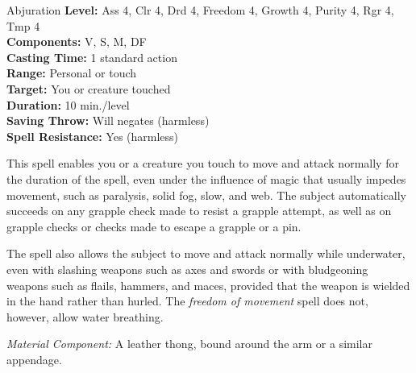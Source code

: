 {Abjuration}
{
	\textbf{Level:}
	Ass 4, Clr 4, Drd 4, Freedom 4, Growth 4, Purity 4, Rgr 4, Tmp 4\\
	\textbf{Components:}
	V, S, M, DF\\
	\textbf{Casting Time:}
	1 standard action\\
	\textbf{Range:}
	Personal or touch\\
	\textbf{Target:}
	You or creature touched\\
	\textbf{Duration:}
	10 min./level\\
	\textbf{Saving Throw:}
	Will negates (harmless)\\
	\textbf{Spell Resistance:}
	Yes (harmless)\\
}
{
	This spell enables you or a creature you touch to move and attack normally for the duration of the spell, even under the influence of magic that usually impedes movement, such as paralysis, solid fog, slow, and web. The subject automatically succeeds on any grapple check made to resist a grapple attempt, as well as on grapple checks or  checks made to escape a grapple or a pin.

	The spell also allows the subject to move and attack normally while underwater, even with slashing weapons such as axes and swords or with bludgeoning weapons such as flails, hammers, and maces, provided that the weapon is wielded in the hand rather than hurled. The \emph{freedom of movement} spell does not, however, allow water breathing.

	\textit{Material Component:}
	A leather thong, bound around the arm or a similar appendage.

}
